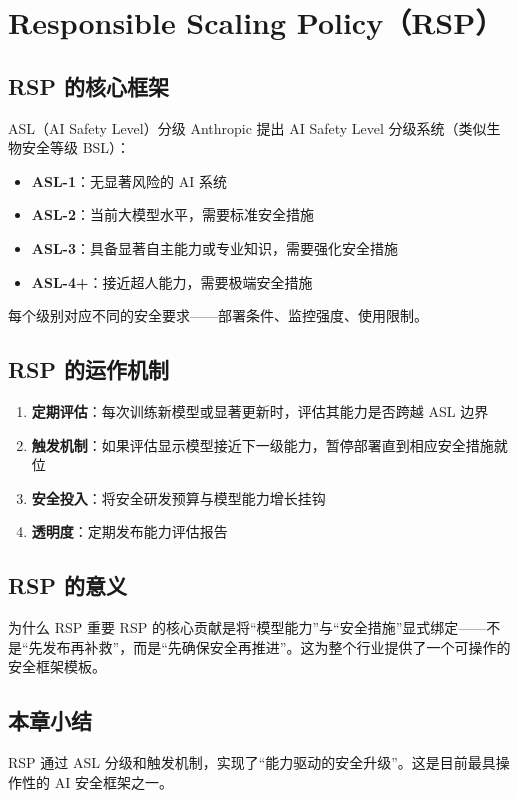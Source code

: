\section{Responsible Scaling Policy（RSP）}

\subsection{RSP 的核心框架}

\begin{importantbox}{ASL（AI Safety Level）分级}
Anthropic 提出 AI Safety Level 分级系统（类似生物安全等级 BSL）：
\begin{itemize}
    \item \textbf{ASL-1}：无显著风险的 AI 系统
    \item \textbf{ASL-2}：当前大模型水平，需要标准安全措施
    \item \textbf{ASL-3}：具备显著自主能力或专业知识，需要强化安全措施
    \item \textbf{ASL-4+}：接近超人能力，需要极端安全措施
\end{itemize}
每个级别对应不同的安全要求——部署条件、监控强度、使用限制。
\end{importantbox}

\subsection{RSP 的运作机制}

\begin{enumerate}
    \item \textbf{定期评估}：每次训练新模型或显著更新时，评估其能力是否跨越 ASL 边界
    \item \textbf{触发机制}：如果评估显示模型接近下一级能力，暂停部署直到相应安全措施就位
    \item \textbf{安全投入}：将安全研发预算与模型能力增长挂钩
    \item \textbf{透明度}：定期发布能力评估报告
\end{enumerate}

\subsection{RSP 的意义}

\begin{knowledgebox}{为什么 RSP 重要}
RSP 的核心贡献是将``模型能力''与``安全措施''显式绑定——不是``先发布再补救''，而是``先确保安全再推进''。这为整个行业提供了一个可操作的安全框架模板。
\end{knowledgebox}

\subsection{本章小结}

RSP 通过 ASL 分级和触发机制，实现了``能力驱动的安全升级''。这是目前最具操作性的 AI 安全框架之一。


